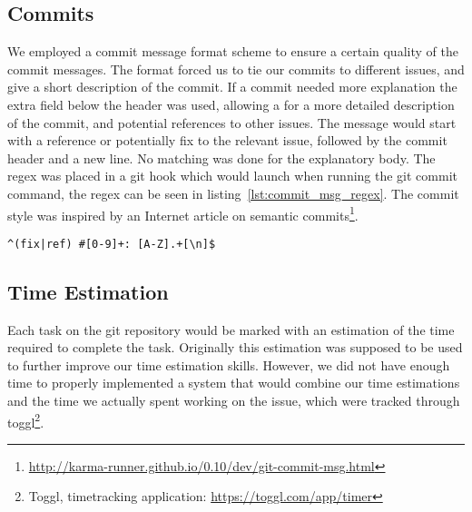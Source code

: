 \subsection{Commits}
We employed a commit message format scheme to ensure a certain quality of the commit messages.
The format forced us to tie our commits to different issues, and give a short description of the commit.
If a commit needed more explanation the extra field below the header was used,
allowing a for a more detailed description of the commit, and potential references to other issues.
The message would start with a reference or potentially fix to the relevant issue,
followed by the commit header and a new line.
No matching was done for the explanatory body.
The regex was placed in a git hook which would launch when running the git commit command, the regex can be seen in listing~\ref{lst:commit_msg_regex}.
The commit style was inspired by an Internet article on semantic commits\footnote{\url{http://karma-runner.github.io/0.10/dev/git-commit-msg.html}}.

\begin{lstlisting}[xleftmargin=18.0ex, caption=Commit Message Regex, captionpos=b, label=lst:commit_msg_regex]
^(fix|ref) #[0-9]+: [A-Z].+[\n]$
\end{lstlisting}

\subsection{Time Estimation}
Each task on the git repository would be marked with an estimation of the time required to complete the task.
Originally this estimation was supposed to be used to further improve our time estimation skills.
However, we did not have enough time to properly implemented a system that would combine our time estimations
and the time we actually spent working on the issue, which were tracked through toggl\footnote{Toggl, timetracking application: \url{https://toggl.com/app/timer}}.

